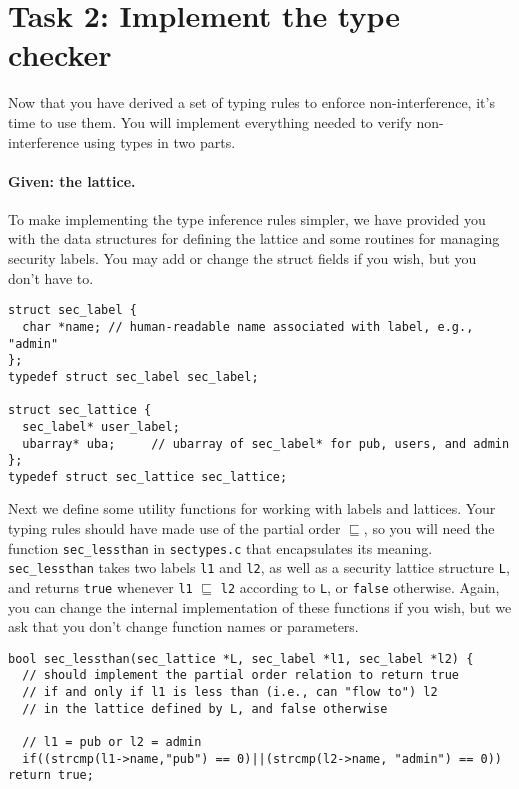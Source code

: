 \documentclass[11pt]{article}
\begin{document}
{\clearpage
\section{Task 2: Implement the type checker}

Now that you have derived a set of typing rules to enforce non-interference, it's time to use them. You will implement everything needed 
to verify non-interference using types in two parts.

\paragraph{Given: the lattice.} To make implementing the type inference rules simpler, we 
have provided you with the data structures for defining the lattice and some routines for managing security labels. 
You may add or change the struct fields if you wish, but you don't have to.

\begin{lstlisting}
struct sec_label {
  char *name; // human-readable name associated with label, e.g., "admin"
};
typedef struct sec_label sec_label;

struct sec_lattice {
  sec_label* user_label;
  ubarray* uba;     // ubarray of sec_label* for pub, users, and admin
};
typedef struct sec_lattice sec_lattice;
\end{lstlisting}

Next we define some utility functions for working with labels and lattices. 
Your typing rules should have made use of the partial order $\sqsubseteq$, so you will need the function \verb'sec_lessthan'
 in \verb'sectypes.c' that encapsulates its meaning. \verb'sec_lessthan' takes two labels \verb'l1' and \verb'l2', 
 as well as a security lattice structure \verb'L', and returns \verb'true' whenever \verb'l1' $\sqsubseteq$ \verb'l2' 
 according to \verb'L', or \verb'false' otherwise. Again, you can change the internal implementation of these functions if you wish, 
 but we ask that you don't change function names or parameters.
 
\begin{lstlisting}
bool sec_lessthan(sec_lattice *L, sec_label *l1, sec_label *l2) {
  // should implement the partial order relation to return true
  // if and only if l1 is less than (i.e., can "flow to") l2
  // in the lattice defined by L, and false otherwise

  // l1 = pub or l2 = admin
  if((strcmp(l1->name,"pub") == 0)||(strcmp(l2->name, "admin") == 0)) return true;


\end{lstlisting}}
\end{document}
